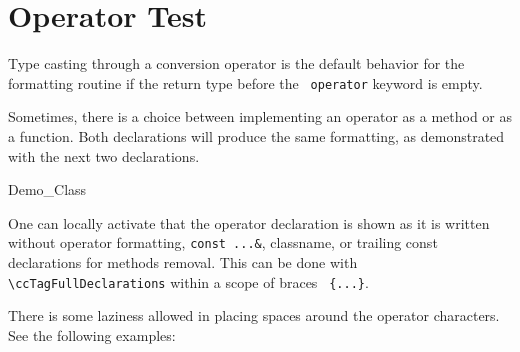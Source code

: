 \documentclass[12pt]{article}
\begin{document}
{

    \ccGlue
    \ccGlue
    \ccGlue

\section{Operator Test}

Type casting through a conversion operator is the default behavior 
for the formatting routine if the return type before the {\tt 
operator} keyword is empty.


    \ccGlue

Sometimes, there is a choice between
implementing an operator as a method or as a function. Both
declarations will produce the same formatting, as demonstrated
with the next two declarations.

\begin{ccClass}{Demo_Class}

    \ccGlue

One can locally activate that the operator declaration is shown as it
is written without operator formatting, {\tt const ...\&}, classname, or
trailing const declarations for methods removal. This can be done with
\verb+\+\verb+ccTagFullDeclarations+ within a scope of braces {\tt
  \{...\}}.

{\ccTagFullDeclarations
}

There is some laziness allowed in placing spaces around the operator
characters. See the following examples:

    \ccGlue
{}
    \ccGlue
{}
    \ccGlue
{}


\end{ccClass}}
\end{document}
